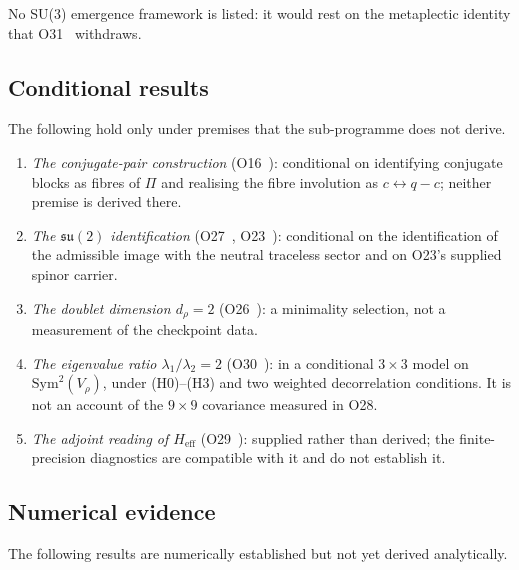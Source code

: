 \documentclass[11pt,a4paper]{article}
\theoremstyle{definition}
\newcommand{\su}{\mathfrak{su}}
\newcommand{\Sym}{\mathrm{Sym}}
\begin{document}
      No SU(3) emergence framework is listed: it would rest on the metaplectic identity that
      O31~\cite{Beau2026a35} withdraws.

    \subsection{Conditional results}
      \label{sec:conditional}

      The following hold only under premises that the sub-programme does not derive.

      \begin{enumerate}
        \item \textit{The conjugate-pair construction} (O16~\cite{Beau2026a20}): conditional on
        identifying conjugate blocks as fibres of $\Pi$ and realising the fibre involution as
        $c \leftrightarrow q-c$; neither premise is derived there.

        \item \textit{The $\su(2)$ identification} (O27~\cite{Beau2026a31}, O23~\cite{Beau2026a27}):
        conditional on the identification of the admissible image with the neutral traceless
        sector and on O23's supplied spinor carrier.

        \item \textit{The doublet dimension $d_\rho = 2$} (O26~\cite{Beau2026a30}): a minimality
        selection, not a measurement of the checkpoint data.

        \item \textit{The eigenvalue ratio $\lambda_1/\lambda_2 = 2$} (O30~\cite{Beau2026a34}):
        in a conditional $3\times3$ model on $\Sym^2(V_\rho)$, under (H0)--(H3) and two weighted
        decorrelation conditions.
        It is not an account of the $9\times9$ covariance measured in O28.

        \item \textit{The adjoint reading of $H_{\mathrm{eff}}$} (O29~\cite{Beau2026a33}):
        supplied rather than derived; the finite-precision diagnostics are compatible with it and
        do not establish it.
      \end{enumerate}

    \subsection{Numerical evidence}
      \label{sec:numerical-evidence}

      The following results are numerically established but not yet derived analytically.
\end{document}
